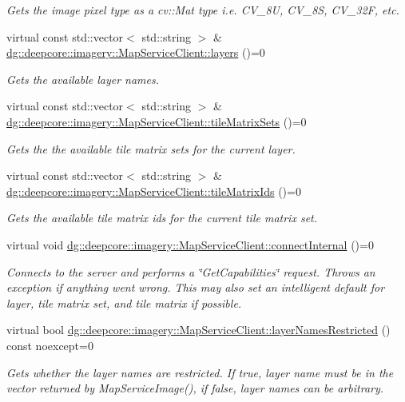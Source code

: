 \begin{DoxyCompactItemize}
\begin{DoxyCompactList}\small\item\em Gets the image pixel type as a cv\+::\+Mat type i.\+e. C\+V\+\_\+8U, C\+V\+\_\+8S, C\+V\+\_\+32F, etc. \end{DoxyCompactList}\item 
virtual const std\+::vector$<$ std\+::string $>$ \& \hyperlink{group___imagery_module_ga51617c7aeaf00918210d64aaf5712d4e}{dg\+::deepcore\+::imagery\+::\+Map\+Service\+Client\+::layers} ()=0
\begin{DoxyCompactList}\small\item\em Gets the available layer names. \end{DoxyCompactList}\item 
virtual const std\+::vector$<$ std\+::string $>$ \& \hyperlink{group___imagery_module_ga1cf271559e56836cf29176382c934a0c}{dg\+::deepcore\+::imagery\+::\+Map\+Service\+Client\+::tile\+Matrix\+Sets} ()=0
\begin{DoxyCompactList}\small\item\em Gets the the available tile matrix sets for the current layer. \end{DoxyCompactList}\item 
virtual const std\+::vector$<$ std\+::string $>$ \& \hyperlink{group___imagery_module_ga2e5ad607fa13ac17e0fcb6b00af7d30e}{dg\+::deepcore\+::imagery\+::\+Map\+Service\+Client\+::tile\+Matrix\+Ids} ()=0
\begin{DoxyCompactList}\small\item\em Gets the available tile matrix ids for the current tile matrix set. \end{DoxyCompactList}\item 
virtual void \hyperlink{group___imagery_module_gabba13ea72115a1196ed44e35cc17f1b9}{dg\+::deepcore\+::imagery\+::\+Map\+Service\+Client\+::connect\+Internal} ()=0
\begin{DoxyCompactList}\small\item\em Connects to the server and performs a \char`\"{}\+Get\+Capabilities\char`\"{} request. Throws an exception if anything went wrong. This may also set an intelligent default for layer, tile matrix set, and tile matrix if possible. \end{DoxyCompactList}\item 
virtual bool \hyperlink{group___imagery_module_ga900665eb2167743cdac5e46ac536c209}{dg\+::deepcore\+::imagery\+::\+Map\+Service\+Client\+::layer\+Names\+Restricted} () const noexcept=0
\begin{DoxyCompactList}\small\item\em Gets whether the layer names are restricted. If true, layer name must be in the vector returned by Map\+Service\+Image(), if false, layer names can be arbitrary. \end{DoxyCompactList}\item 

\end{DoxyCompactItemize}

